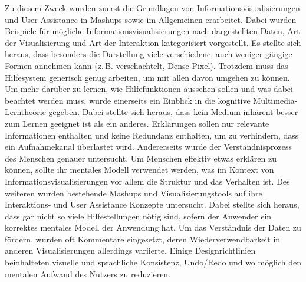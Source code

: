 \documentclass[
	headsepline,
	footsepline,
	fontsize=12pt,
	bibliography=totoc
]{scrbook}
\begin{document}
Zu diesem Zweck wurden zuerst die Grundlagen von Informationsvisualisierungen und User Assistance in Mashups sowie im Allgemeinen erarbeitet. Dabei wurden Beispiele für mögliche Informationsvisualisierungen nach dargestellten Daten, Art der Visualisierung und Art der Interaktion kategorisiert vorgestellt. Es stellte sich heraus, dass besonders die Darstellung viele verschiedene, auch weniger gängige Formen annehmen kann (z.\,B. verschachtelt, Dense Pixel). Trotzdem muss das Hilfesystem generisch genug arbeiten, um mit allen davon umgehen zu können. Um mehr darüber zu lernen, wie Hilfefunktionen aussehen sollen und was dabei beachtet werden muss, wurde einerseits ein Einblick in die kognitive Multimedia-Lerntheorie gegeben. Dabei stellte sich heraus, dass kein Medium inhärent besser zum Lernen geeignet ist als ein anderes. Erklärungen sollen nur relevante Informationen enthalten und keine Redundanz enthalten, um zu verhindern, dass ein Aufnahmekanal überlastet wird. Andererseits wurde der Verständnisprozess des Menschen genauer untersucht. Um Menschen effektiv etwas erklären zu können, sollte ihr mentales Modell verwendet werden, was im Kontext von Informationsvisualisierungen vor allem die Struktur und das Verhalten ist. Des weiteren wurden bestehende Mashups und Visualisierungstools auf ihre Interaktions- und User Assistance Konzepte untersucht. Dabei stellte sich heraus, dass gar nicht so viele Hilfestellungen nötig sind, sofern der Anwender ein korrektes mentales Modell der Anwendung hat. Um das Verständnis der Daten zu fördern, wurden oft Kommentare eingesetzt, deren Wiederverwendbarkeit in anderen Visualisierungen allerdings variierte. Einige Designrichtlinien beinhalteten visuelle und sprachliche Konsistenz, Undo/Redo und wo möglich den mentalen Aufwand des Nutzers zu reduzieren.

\end{document}
